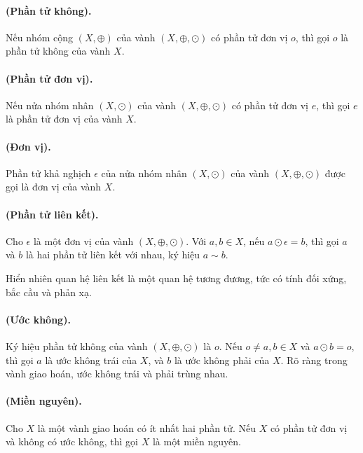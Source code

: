 \documentclass[11pt]{article}
\begin{document}
\paragraph{ (Phần tử không).}
Nếu nhóm cộng \((X,\oplus)\) của vành \((X,\oplus,\odot)\) có phần tử đơn vị
\(o\), thì gọi \(o\) là phần tử không của vành \(X\).

\paragraph{ (Phần tử đơn vị).}
Nếu nửa nhóm nhân \((X,\odot)\) của vành \((X,\oplus,\odot)\) có phần tử đơn
vị \(e\), thì gọi \(e\) là phần tử đơn vị của vành \(X\).

\paragraph{ (Đơn vị).}
Phần tử khả nghịch \(\epsilon\) của nửa nhóm nhân \((X,\odot)\) của vành
\((X,\oplus,\odot)\) được gọi là đơn vị của vành \(X\).

\paragraph{ (Phần tử liên kết).}
Cho \(\epsilon\) là một đơn vị của vành \((X,\oplus,\odot)\). Với
\(a,b\in X\), nếu \(a\odot\epsilon=b\), thì gọi \(a\) và \(b\) là hai phần tử
liên kết với nhau, ký hiệu \(a\sim b\).

Hiển nhiên quan hệ liên kết là một quan hệ tương đương, tức có tính đối xứng,
bắc cầu và phản xạ.

\paragraph{ (Ước không).}
Ký hiệu phần tử không của vành \((X,\oplus,\odot)\) là \(o\). Nếu
\(o\ne a,b\in X\) và \(a\odot b=o\), thì gọi \(a\) là ước không trái của
\(X\), và \(b\) là ước không phải của \(X\). Rõ ràng trong vành giao hoán, ước
không trái và phải trùng nhau.

\paragraph{ (Miền nguyên).}
Cho \(X\) là một vành giao hoán có ít nhất hai phần tử. Nếu \(X\) có phần tử
đơn vị và không có ước không, thì gọi \(X\) là một miền nguyên.
\end{document}
